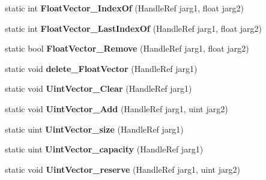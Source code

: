 \begin{DoxyCompactItemize}
\item 
\hypertarget{class_assimp_p_i_n_v_o_k_e_a1c0d24af5aa5186d76393e4160820832}{static int {\bfseries Float\+Vector\+\_\+\+Index\+Of} (Handle\+Ref jarg1, float jarg2)}\label{class_assimp_p_i_n_v_o_k_e_a1c0d24af5aa5186d76393e4160820832}

\item 
\hypertarget{class_assimp_p_i_n_v_o_k_e_ad859b2cb2ddbc25a0db1027c03f67091}{static int {\bfseries Float\+Vector\+\_\+\+Last\+Index\+Of} (Handle\+Ref jarg1, float jarg2)}\label{class_assimp_p_i_n_v_o_k_e_ad859b2cb2ddbc25a0db1027c03f67091}

\item 
\hypertarget{class_assimp_p_i_n_v_o_k_e_abb0296f2a72345bd1d5318ac7e63f50d}{static bool {\bfseries Float\+Vector\+\_\+\+Remove} (Handle\+Ref jarg1, float jarg2)}\label{class_assimp_p_i_n_v_o_k_e_abb0296f2a72345bd1d5318ac7e63f50d}

\item 
\hypertarget{class_assimp_p_i_n_v_o_k_e_adb8dfb23fae3f329c1d852eb56da5c01}{static void {\bfseries delete\+\_\+\+Float\+Vector} (Handle\+Ref jarg1)}\label{class_assimp_p_i_n_v_o_k_e_adb8dfb23fae3f329c1d852eb56da5c01}

\item 
\hypertarget{class_assimp_p_i_n_v_o_k_e_af10023abd24e57efb3426ed0578665ba}{static void {\bfseries Uint\+Vector\+\_\+\+Clear} (Handle\+Ref jarg1)}\label{class_assimp_p_i_n_v_o_k_e_af10023abd24e57efb3426ed0578665ba}

\item 
\hypertarget{class_assimp_p_i_n_v_o_k_e_a77d271a2efca87f75bfbee937708dd43}{static void {\bfseries Uint\+Vector\+\_\+\+Add} (Handle\+Ref jarg1, uint jarg2)}\label{class_assimp_p_i_n_v_o_k_e_a77d271a2efca87f75bfbee937708dd43}

\item 
\hypertarget{class_assimp_p_i_n_v_o_k_e_a3ed4be93e7d7a68c17bf5d7d6d0836bd}{static uint {\bfseries Uint\+Vector\+\_\+size} (Handle\+Ref jarg1)}\label{class_assimp_p_i_n_v_o_k_e_a3ed4be93e7d7a68c17bf5d7d6d0836bd}

\item 
\hypertarget{class_assimp_p_i_n_v_o_k_e_ad4dd05892629b186cc0f818276323357}{static uint {\bfseries Uint\+Vector\+\_\+capacity} (Handle\+Ref jarg1)}\label{class_assimp_p_i_n_v_o_k_e_ad4dd05892629b186cc0f818276323357}

\item 
\hypertarget{class_assimp_p_i_n_v_o_k_e_aaec3ea68a73910b84ee307af6656c16b}{static void {\bfseries Uint\+Vector\+\_\+reserve} (Handle\+Ref jarg1, uint jarg2)}\label{class_assimp_p_i_n_v_o_k_e_aaec3ea68a73910b84ee307af6656c16b}


\end{DoxyCompactItemize}
